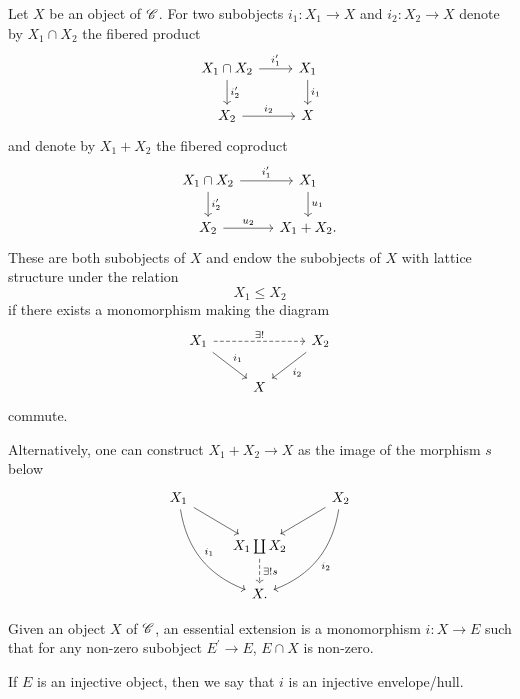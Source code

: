 \documentclass[dissertation.tex]{subfiles}
\begin{document}
\begin{defn}
  Let $X$ be an object of $\mathscr{C}$.
  For two subobjects $i_1 \colon X_1 \rightarrow X$ and $i_2 \colon X_2 \rightarrow X$ denote by $X_1 \cap X_2$ the fibered product
  $$\begin{tikzcd}
    X_1 \cap X_2 \arrow{d}{i_2^\prime}\arrow{r}{i_1^\prime} & X_1\arrow{d}{i_1}\\
    X_2 \arrow{r}{i_2} & X
  \end{tikzcd}$$
  and denote by $X_1 + X_2$ the fibered coproduct 
  $$\begin{tikzcd}
    X_1 \cap X_2 \arrow{r}{i_1^\prime} \arrow{d}{i_2^\prime} & X_1\arrow{d}{u_1}\\
    X_2 \arrow{r}{u_2} & X_1 + X_2.
  \end{tikzcd}$$
  These are both subobjects of $X$ and endow the subobjects of $X$ with lattice structure under the relation
  $$X_1 \leq X_2$$
  if there exists a monomorphism making the diagram
  $$\begin{tikzcd}
    X_1\arrow{rd}{i_1}\arrow[dashed]{rr}{\exists !} & & X_2 \arrow{ld}{i_2}\\
    & X &
  \end{tikzcd}$$
  commute.
\end{defn}

\begin{rmk}
  Alternatively, one can construct $X_1 + X_2 \rightarrow X$ as the image of the morphism $s$ below
  $$\begin{tikzcd}
    X_1\arrow[bend right]{rdd}{i_1}\arrow{rd} & & X_2 \arrow{ld} \arrow[bend left]{ldd}{i_2}\\
    & X_1 \coprod X_2\arrow[dashed]{d}{\exists !s} &\\
    & X. &
  \end{tikzcd}$$
\end{rmk}

\begin{defn}
  Given an object $X$ of $\mathscr{C}$, an essential extension is a monomorphism $i \colon X \rightarrow E$ such that for any non-zero subobject $E^\prime \rightarrow E$, $E \cap X$ is non-zero.
  
  If $E$ is an injective object, then we say that $i$ is an injective envelope/hull.
\end{defn}
\end{document}

